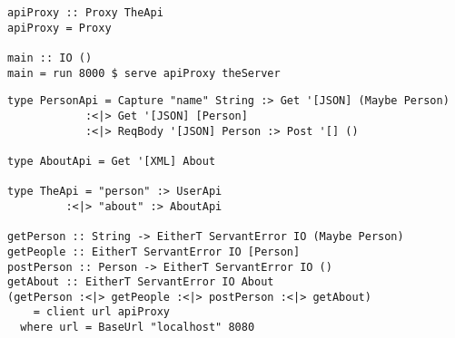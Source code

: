 \documentclass{beamer}
\begin{document}
\begin{frame}[fragile]

\begin{verbatim}
apiProxy :: Proxy TheApi
apiProxy = Proxy

main :: IO ()
main = run 8000 $ serve apiProxy theServer
\end{verbatim}

\end{frame}

\begin{frame}[fragile]

\begin{verbatim}
type PersonApi = Capture "name" String :> Get '[JSON] (Maybe Person)
            :<|> Get '[JSON] [Person]
            :<|> ReqBody '[JSON] Person :> Post '[] ()

type AboutApi = Get '[XML] About

type TheApi = "person" :> UserApi
         :<|> "about" :> AboutApi

getPerson :: String -> EitherT ServantError IO (Maybe Person)
getPeople :: EitherT ServantError IO [Person]
postPerson :: Person -> EitherT ServantError IO ()
getAbout :: EitherT ServantError IO About
(getPerson :<|> getPeople :<|> postPerson :<|> getAbout)
    = client url apiProxy
  where url = BaseUrl "localhost" 8080
\end{verbatim}

\end{frame}
\end{document}
